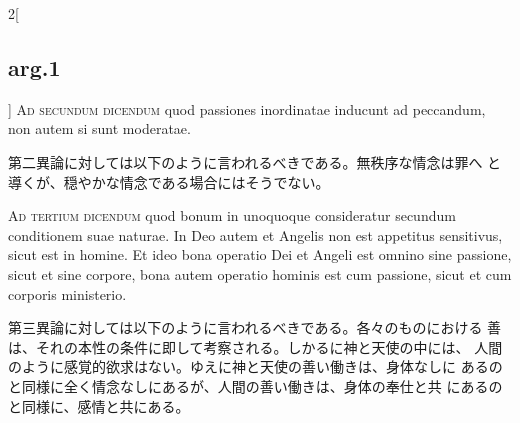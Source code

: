 \documentclass[paper=a4paper,fontsize=10pt,jafontsize=9pt,titlepage]{jlreq}
\begin{document}
\begin{paracol}{2}[\subsection{arg.1}]
{\scshape Ad secundum dicendum} quod passiones inordinatae inducunt
 ad peccandum, non autem si sunt moderatae.

\switchcolumn

第二異論に対しては以下のように言われるべきである。無秩序な情念は罪へ
 と導くが、穏やかな情念である場合にはそうでない。

\switchcolumn*[\subsection{ad.3}]

{\scshape Ad tertium dicendum} quod bonum in unoquoque consideratur
 secundum conditionem suae naturae. In Deo autem et Angelis non est
 appetitus sensitivus, sicut est in homine. Et ideo bona operatio Dei
 et Angeli est omnino sine passione, sicut et sine corpore, bona autem
 operatio hominis est cum passione, sicut et cum corporis ministerio.

\switchcolumn

第三異論に対しては以下のように言われるべきである。各々のものにおける
 善は、それの本性の条件に即して考察される。しかるに神と天使の中には、
 人間のように感覚的欲求はない。ゆえに神と天使の善い働きは、身体なしに
 あるのと同様に全く情念なしにあるが、人間の善い働きは、身体の奉仕と共
 にあるのと同様に、感情と共にある。

\end{paracol}
\end{document}
